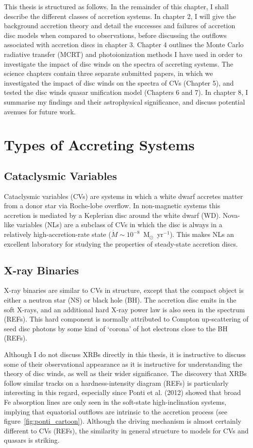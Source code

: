 This thesis is structured as follows. In the remainder of this chapter, 
I shall describe the different classes of accretion systems. In chapter 2, 
I will give the background accretion theory and detail the successes and failures
of accretion disc models when compared to observations, before 
discussing the outflows associated with accretion discs in chapter 3. Chapter 4
outlines the Monte Carlo radiative transfer (MCRT) and photoionization
methods I have used in order to investigate the impact of disc 
winds on the spectra of accreting systems. The science chapters
contain three separate submitted papers, in which we investigated the impact
of disc winds on the spectra of CVs (Chapter 5), and tested the disc winds
quasar unification model (Chapters 6 and 7).
In chapter 8, I summarise my findings and their astrophysical significance, 
and discuss potential avenues for future work.


\section{Types of Accreting Systems}

\subsection{Cataclysmic Variables}
Cataclysmic variables (CVs) are systems in which a white dwarf
accretes matter from a donor star via Roche-lobe overflow. In
non-magnetic systems this accretion is mediated by a Keplerian disc
around the white dwarf (WD). Nova-like variables (NLs) are a subclass
of CVs in which the  disc is always in a relatively
high-accretion-rate state ($\dot{M} \sim 10^{-8}$~M$_{\odot}$~yr$^{-1}$).  
This makes NLs an excellent laboratory for studying the properties of 
steady-state accretion discs. 

\subsection{X-ray Binaries}
X-ray binaries are similar to CVs in structure, except that the compact object
is either a neutron star (NS) or black hole (BH). The accretion disc 
emits in the soft X-rays, and an additional hard X-ray power law is also 
seen in the spectrum (REFs). This hard component is normally attributed
to Compton up-scattering of seed disc photons by some kind of `corona'
of hot electrons close to the BH (REFs). 

Although I do not discuss XRBs directly in this thesis, it is instructive
to discuss some of their observational appearance as it is instructive 
for understanding the theory of disc winds, as well as their wider significance. 
The discovery that XRBs follow similar tracks on a hardness-intensity diagram (REFs)
is particularly interesting in this regard, especially since Ponti et al. (2012)
showed that broad Fe absorption lines are only seen in the soft-state 
high-inclination systems, implying that equatorial outflows are intrinsic to 
the accretion process (see figure~\ref{fig:ponti_cartoon}). Although the driving mechanism
is almost certainly different to CVs (REFs), the similarity in general structure 
to models for CVs and quasars is striking.

